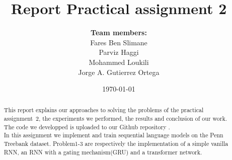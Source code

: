 \documentclass[a4paper]{article}
\title{Report Practical assignment 2}
\author{\textbf{Team members:}\\
Fares Ben Slimane \\
Parviz Haggi \\
Mohammed Loukili \\
Jorge A. Gutierrez Ortega
}
\date{\today}
\begin{document}
\maketitle

\begin{abstract}
This report explains our approaches to solving the problems of the practical assignment~2, the experiments we performed, the results and conclusion of our work. The code we developped is uploaded to our Github repository \cite{github}.\\
In this assignment we implement and train sequential language models on the Penn Treebank dataset. Problem1-3 are respectively the implementation of a simple vanilla RNN, an RNN with a gating mechanism(GRU) and a transformer network.
\end{abstract}








 \newpage
\begin{thebibliography}{9}

  
  
\end{thebibliography}
\end{document}
